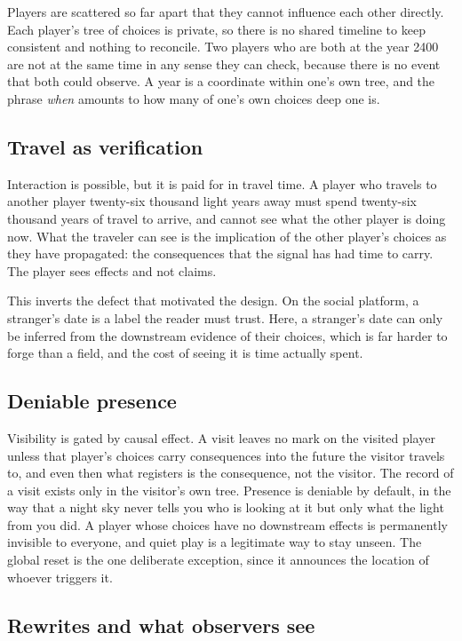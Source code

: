 \documentclass[11pt]{article}
\begin{document}
Players are scattered so far apart that they cannot influence each other directly. Each player's tree of choices is private, so there is no shared timeline to keep consistent and nothing to reconcile. Two players who are both at the year 2400 are not at the same time in any sense they can check, because there is no event that both could observe. A year is a coordinate within one's own tree, and the phrase \emph{when} amounts to how many of one's own choices deep one is.

\subsection{Travel as verification}

Interaction is possible, but it is paid for in travel time. A player who travels to another player twenty-six thousand light years away must spend twenty-six thousand years of travel to arrive, and cannot see what the other player is doing now. What the traveler can see is the implication of the other player's choices as they have propagated: the consequences that the signal has had time to carry. The player sees effects and not claims.

This inverts the defect that motivated the design. On the social platform, a stranger's date is a label the reader must trust. Here, a stranger's date can only be inferred from the downstream evidence of their choices, which is far harder to forge than a field, and the cost of seeing it is time actually spent.

\subsection{Deniable presence}

Visibility is gated by causal effect. A visit leaves no mark on the visited player unless that player's choices carry consequences into the future the visitor travels to, and even then what registers is the consequence, not the visitor. The record of a visit exists only in the visitor's own tree. Presence is deniable by default, in the way that a night sky never tells you who is looking at it but only what the light from you did. A player whose choices have no downstream effects is permanently invisible to everyone, and quiet play is a legitimate way to stay unseen. The global reset is the one deliberate exception, since it announces the location of whoever triggers it.

\subsection{Rewrites and what observers see}
\end{document}
